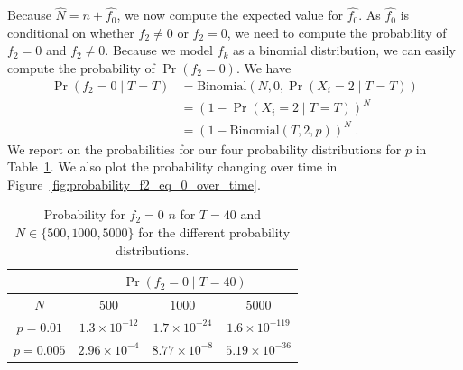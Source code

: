 \documentclass{article}
\begin{document}
Because $\hat{N} = n + \hat{f_0}$, we now compute the expected value for $\hat{f_0}$.
As $\hat{f_0}$ is conditional on whether $f_2 \neq 0$ or $f_2 = 0$, we need to compute the probability of $f_2 = 0$ and $f_2 \neq 0$.
Because we model $f_k$ as a binomial distribution, we can easily compute the probability of $\Pr(f_2 = 0)$. We have 
\begin{align*}
    \Pr(f_2 = 0 \mid T=T) &= \mathrm{Binomial}(N, 0, \Pr(X_i = 2\mid T=T)) \\
    &= (1 - \Pr(X_i = 2\mid T=T))^N \\
    &= {\left( 1 - \mathrm{Binomial}(T, 2, p) \right)}^N\;.
\end{align*}
We report on the probabilities for our four probability distributions for $p$ in Table~\ref{tab:probability_f2_eq_0}. We also plot the probability changing over time in Figure~\ref{fig:probability_f2_eq_0_over_time}.

\begin{table}[t]
    \centering
    \begin{tabular}{c|c c c}
        \toprule
         & \multicolumn{3}{c}{$\Pr(f_2 = 0 \mid T=40)$} \\
        \midrule
        $N$ & $500$ & $1000$ & $5000$ \\
        \midrule
        $p=0.01$ & $1.3 \times 10^{-12}$ & $1.7 \times 10^{-24}$ & $1.6 \times 10^{-119}$ \\
        $p=0.005$ & $2.96 \times 10^{-4}$ & $8.77 \times 10^{-8}$ & $5.19 \times 10^{-36}$ \\
    \end{tabular}
    \caption{Probability for $f_2 = 0$ $n$ for $T=40$ and $N \in \{500, 1000, 5000\}$ for the different probability distributions.}
    \label{tab:probability_f2_eq_0}
\end{table}
\end{document}
